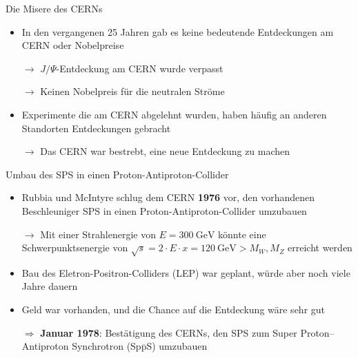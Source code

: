 \documentclass[aspectratio=1610, professionalfonts, 10pt]{beamer}
\begin{document}
\begin{frame}{Die Misere des CERNs}
				\begin{itemize}
					\setlength\itemsep{0.5em}
					\item In den vergangenen 25 Jahren gab es keine bedeutende Entdeckungen am CERN oder Nobelpreise
					\item[$\rightarrow$] $J/\Psi$-Entdeckung am CERN wurde verpasst
					\item[$\rightarrow$] Keinen Nobelpreis für die neutralen Ströme
					\item Experimente die am CERN abgelehnt wurden, haben häufig an anderen Standorten Entdeckungen gebracht
				\end{itemize}
				\vspace*{10px}
				\begin{itemize}
					\item[$\rightarrow$] Das CERN war bestrebt, eine neue Entdeckung zu machen
				\end{itemize}
\end{frame}

\begin{frame}{Umbau des SPS in einen Proton-Antiproton-Collider}
				\begin{itemize}
					\setlength\itemsep{0.5em}
					\item Rubbia und McIntyre schlug dem CERN \textbf{1976} vor, den vorhandenen Beschleuniger SPS in einen Proton-Antiproton-Collider umzubauen
					\item[$\rightarrow$] Mit einer Strahlenergie von $E = \SI{300}{\giga\electronvolt}$ könnte eine Schwerpunktsenergie von $\sqrt{s} = 2 \cdot E \cdot x = \SI{120}{\giga\electronvolt} > M_W, M_Z$ erreicht werden
					\item Bau des Eletron-Positron-Colliders (LEP) war geplant, würde aber noch viele Jahre dauern
					\item Geld war vorhanden, und die Chance auf die Entdeckung wäre sehr gut
				\end{itemize}
					\vspace*{10px}
				\begin{itemize}
					\item[$\Rightarrow$] \textbf{Januar 1978}: Bestätigung des CERNs, den SPS zum Super Proton–Antiproton Synchrotron (Sp$\overline{\text{p}}$S) umzubauen
				\end{itemize}
\end{frame}


%
\end{document}
